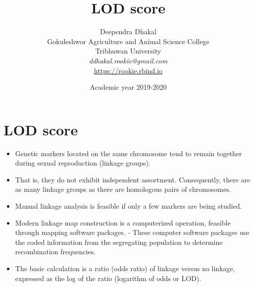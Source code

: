 \documentclass[11pt,dvipsnames,ignorenonframetext,aspectratio=169]{beamer}
\title[]{LOD score}
\author[
        Deependra Dhakal\\
Gokuleshwor Agriculture and Animal Science College\\
Tribhuwan University\\
\textit{ddhakal.rookie@gmail.com}\\
\url{https://rookie.rbind.io}
    ]{Deependra Dhakal\\
Gokuleshwor Agriculture and Animal Science College\\
Tribhuwan University\\
\textit{ddhakal.rookie@gmail.com}\\
\url{https://rookie.rbind.io}}
\date[
      Academic year 2019-2020
  ]{
      Academic year 2019-2020
        }
\providecommand{\tightlist}{%
  \setlength{\itemsep}{0pt}\setlength{\parskip}{0pt}}
\begin{document}
  \begin{frame}[plain]
  \titlepage
  \end{frame}



\hypertarget{lod-score}{%
\section{LOD score}\label{lod-score}}

\begin{frame}{}
\protect\hypertarget{section}{}

\begin{itemize}
\tightlist
\item
  Genetic markers located on the same chromosome tend to remain together
  during sexual reproduction (linkage groups).
\item
  That is, they do not exhibit independent assortment. Consequently,
  there are as many linkage groups as there are homologous pairs of
  chromosomes.
\item
  Manual linkage analysis is feasible if only a few markers are being
  studied.
\item
  Modern linkage map construction is a computerized operation, feasible
  through mapping software packages. - These computer software packages
  use the coded information from the segregating population to determine
  recombination frequencies.
\item
  The basic calculation is a ratio (odds ratio) of linkage versus no
  linkage, expressed as the log of the ratio (logarithm of odds or LOD).
\end{itemize}

\end{frame}
\end{document}
